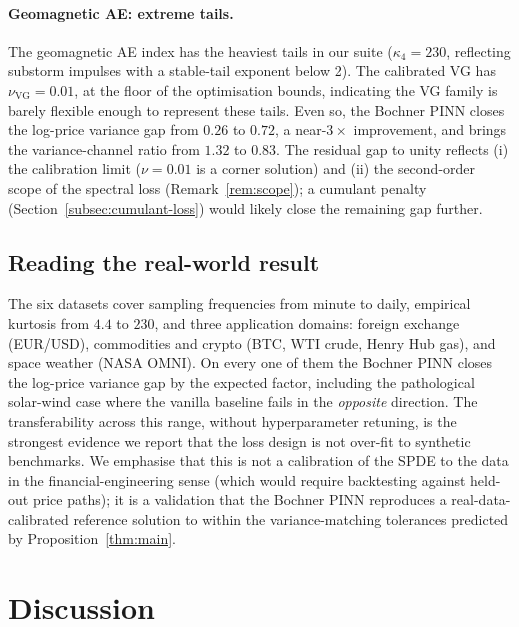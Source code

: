 \documentclass[review,12pt]{elsarticle}
\begin{document}
\paragraph{Geomagnetic AE: extreme tails.}
The geomagnetic AE index has the heaviest tails in our suite
(\(\kappa_4 = 230\), reflecting substorm impulses with a stable-tail
exponent below 2). The calibrated VG has
\(\nu_{\mathrm{VG}} = 0.01\), at the floor of the optimisation
bounds, indicating the VG family is barely flexible enough to
represent these tails. Even so, the Bochner PINN closes the
log-price variance gap from \(0.26\) to \(0.72\), a near-\(3\times\)
improvement, and brings the variance-channel ratio from \(1.32\) to
\(0.83\). The residual gap to unity reflects (i) the calibration
limit (\(\nu = 0.01\) is a corner solution) and (ii) the
second-order scope of the spectral loss
(Remark~\ref{rem:scope}); a cumulant penalty
(Section~\ref{subsec:cumulant-loss}) would likely close the
remaining gap further.

\subsection{Reading the real-world result}

The six datasets cover sampling frequencies from minute to daily,
empirical kurtosis from \(4.4\) to \(230\), and three application
domains: foreign exchange (EUR/USD), commodities and crypto (BTC,
WTI crude, Henry Hub gas), and space weather (NASA OMNI). On every
one of them the Bochner PINN closes the log-price variance gap by
the expected factor, including the pathological solar-wind case
where the vanilla baseline fails in the \emph{opposite} direction.
The transferability across this range, without
hyperparameter retuning, is the strongest evidence we report
that the loss design is not over-fit to synthetic benchmarks. We
emphasise that this is not a calibration of the SPDE to the data in
the financial-engineering sense (which would require backtesting
against held-out price paths); it is a validation that the Bochner
PINN reproduces a real-data-calibrated reference solution to
within the variance-matching tolerances predicted by
Proposition~\ref{thm:main}.

\section{Discussion}
\label{sec:discussion}
\end{document}
